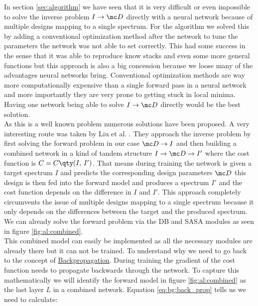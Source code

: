 In section \ref{sec:algorithm} we have seen that it is very difficult or even impossible to solve the inverse problem $I \rightarrow \mc D$ directly with a neural network because of multiple designs mapping to a single spectrum. For the algorithm we solved this by adding a conventional optimization method after the network to tune the parameters the network was not able to set correctly. This had some success in the sense that it was able to reproduce know stacks and even some more general functions  but this approach is also a big concession because we loose many of the advantages neural networks bring. Conventional optimization methods are way more computationally expensive than a single forward pass in a neural network and more importantly they are very prone to getting stuck in local minima. Having one network being able to solve $I \rightarrow \mc D$ directly would be the best solution.
\\

\indent As this is a well known problem numerous solutions have been proposed. A very interesting route was taken by Liu et al. \cite{Liu2018}. They approach the inverse problem by first solving the forward problem in our case $\mc D \rightarrow I$ and then building a combined network in a kind of tandem structure 
$I \rightarrow \mc D \rightarrow I'$
where the cost function is 
$C = C \qty(I, \, I')$.
That means during training the network is given a target spectrum $I$ and predicts the corresponding design parameters $\mc D$ this design is then fed into the forward model and produces a spectrum $I'$ and the cost function depends on the difference in $I$ and $I'$. This approach completely circumvents the issue of multiple designs mapping to a single spectrum because it only depends on the differences between the target and the produced spectrum. We can already solve the forward problem via the DB and SASA modules as seen in figure \ref{fig:al:combined}.
\\


\indent This combined model can easily be implemented as all the necessary modules are already there but it can not be trained. To understand why we need to go back to the concept of {\hyperref[eq:bg:back_prop]{Backpropagation}}.
During training the gradient of the cost function needs to propagate backwards through the network. To capture this mathematically we will identify the forward model in figure \ref{fig:al:combined} as the last layer $L$ in a combined network. Equation \eqref{eq:bg:back_prop} tells us we need to calculate:

